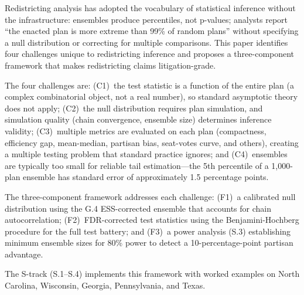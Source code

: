 Redistricting analysis has adopted the vocabulary of statistical inference
without the infrastructure: ensembles produce percentiles, not p-values;
analysts report ``the enacted plan is more extreme than 99\% of random plans''
without specifying a null distribution or correcting for multiple comparisons.
This paper identifies four challenges unique to redistricting inference
and proposes a three-component framework that makes redistricting claims
litigation-grade.

The four challenges are: (C1)~the test statistic is a function of the entire
plan (a complex combinatorial object, not a real number), so standard
asymptotic theory does not apply; (C2)~the null distribution requires
plan simulation, and simulation quality (chain convergence, ensemble size)
determines inference validity; (C3)~multiple metrics are evaluated on each
plan (compactness, efficiency gap, mean-median, partisan bias, seat-votes
curve, and others), creating a multiple testing problem that standard
practice ignores; and (C4)~ensembles are typically too small for reliable
tail estimation---the 5th percentile of a 1,000-plan ensemble has
standard error of approximately 1.5 percentage points.

The three-component framework addresses each challenge:
(F1)~a calibrated null distribution using the G.4 ESS-corrected ensemble
that accounts for chain autocorrelation;
(F2)~FDR-corrected test statistics using the Benjamini-Hochberg procedure
for the full test battery;
and (F3)~a power analysis (S.3) establishing minimum ensemble sizes for
80\% power to detect a 10-percentage-point partisan advantage.

The S-track (S.1--S.4) implements this framework with worked examples
on North Carolina, Wisconsin, Georgia, Pennsylvania, and Texas.
